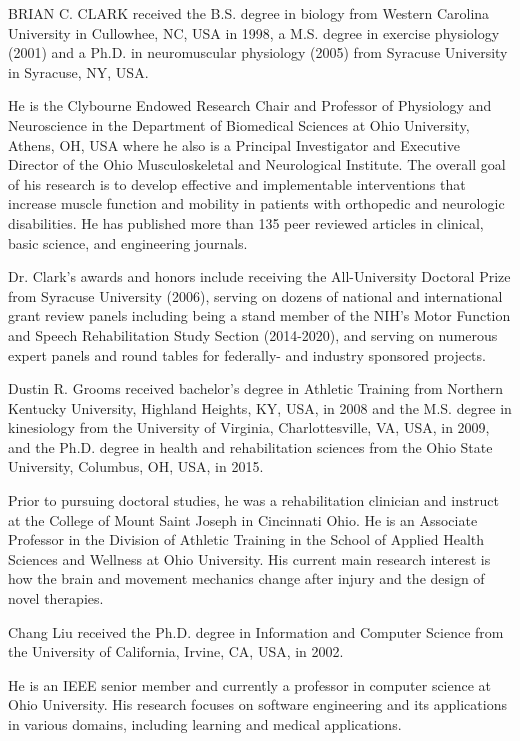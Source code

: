 \documentclass{ieeeaccess}
\begin{document}
\begin{IEEEbiography}{BRIAN C. CLARK} received the B.S. degree in biology from Western Carolina University in Cullowhee, NC, USA in 1998, a M.S. degree in exercise physiology (2001) and a Ph.D. in neuromuscular physiology (2005) from Syracuse University in Syracuse, NY, USA.

He is the Clybourne Endowed Research Chair and Professor of Physiology and Neuroscience in the Department of Biomedical Sciences at Ohio University, Athens, OH, USA where he also is a Principal Investigator and Executive Director of the Ohio Musculoskeletal and Neurological Institute. The overall goal of his research is to develop effective and implementable interventions that increase muscle function and mobility in patients with orthopedic and neurologic disabilities. He has published more than 135 peer reviewed articles in clinical, basic science, and engineering journals.

Dr. Clark’s awards and honors include receiving the All-University Doctoral Prize from Syracuse University (2006), serving on dozens of national and international grant review panels including being a stand member of the NIH’s Motor Function and Speech Rehabilitation Study Section (2014-2020), and serving on numerous expert panels and round tables for federally- and industry sponsored projects.
 
\end{IEEEbiography}

\begin{IEEEbiography}{Dustin R. Grooms} received bachelor’s degree in Athletic Training from Northern Kentucky University, Highland Heights, KY, USA, in 2008 and the M.S. degree in kinesiology from the University of Virginia, Charlottesville, VA, USA, in 2009, and the Ph.D. degree in health and rehabilitation sciences from the Ohio State University, Columbus, OH, USA, in 2015. 

Prior to pursuing doctoral studies, he was a rehabilitation clinician and instruct at the College of Mount Saint Joseph in Cincinnati Ohio. He is an Associate Professor in the Division of Athletic Training in the School of Applied Health Sciences and Wellness at Ohio University. His current main research interest is how the brain and movement mechanics change after injury and the design of novel therapies.


\end{IEEEbiography}

\begin{IEEEbiography}{Chang Liu} received the Ph.D. degree in Information and Computer Science from the University of California, Irvine, CA, USA, in 2002. 

He is an IEEE senior member and currently a professor in computer science at Ohio University. His research focuses on software engineering and its applications in various domains, including learning and medical applications. 
\end{IEEEbiography}

\EOD
\end{document}

